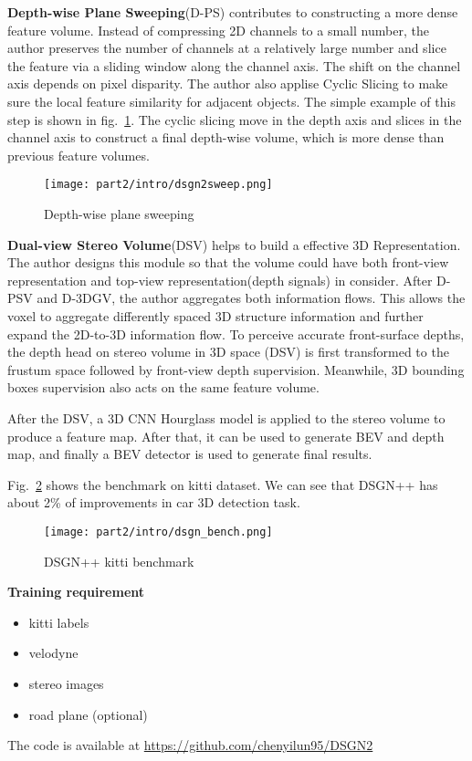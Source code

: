 \documentclass[12pt]{article}
\begin{document}
\textbf{Depth-wise Plane Sweeping}(D-PS) contributes to constructing a more dense feature volume. Instead of compressing 2D channels to a small number, the author preserves the number of channels at a relatively large number and slice the feature via a sliding window along the channel axis. The shift on the channel axis depends on pixel disparity. The author also applise Cyclic Slicing to make sure the local feature similarity for adjacent objects. The simple example of this step is shown in fig.~\ref{dsgn2sweep}. The cyclic slicing move in the depth axis and slices in the channel axis to construct a final depth-wise volume, which is more dense than previous feature volumes.
\begin{figure}[H]
    \centering
    \texttt{[image: part2/intro/dsgn2sweep.png]}
    \caption{Depth-wise plane sweeping}
    \label{dsgn2sweep}
\end{figure}

\textbf{Dual-view Stereo Volume}(DSV) helps to build a effective 3D Representation. The author designs this module so that the volume could have both front-view representation and top-view representation(depth signals) in consider. After D-PSV and D-3DGV, the author aggregates both information flows. This allows the voxel to aggregate differently spaced 3D structure information and further expand the 2D-to-3D information flow. To perceive accurate front-surface depths, the depth head on stereo volume in 3D space (DSV) is first transformed to the frustum space followed by front-view depth supervision. Meanwhile, 3D bounding boxes supervision also acts on the same feature volume.

After the DSV, a 3D CNN Hourglass model is applied to the stereo volume to produce a feature map. After that, it can be used to generate BEV and depth map, and finally a BEV detector is used to generate final results.

Fig.~\ref{dsgnbench} shows the benchmark on kitti dataset. We can see that DSGN++ has about 2\% of improvements in car 3D detection task.
\begin{figure}[H]
    \centering
    \texttt{[image: part2/intro/dsgn\_bench.png]}
    \caption{DSGN++ kitti benchmark}
    \label{dsgnbench}
\end{figure}
\textbf{Training requirement}
\begin{itemize}
    \item kitti labels
    \item velodyne
    \item stereo images
    \item road plane (optional)
\end{itemize}
The code is available at \url{https://github.com/chenyilun95/DSGN2}
\end{document}
